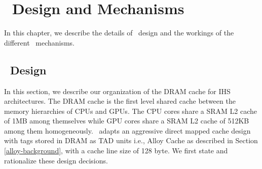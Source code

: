 \chapter{\cachename\ Design and Mechanisms} \label{chap:hashcache}
In this chapter, we describe the details of \cachename\ design and the workings of the different \cachename\ mechanisms.
\section{\cachename\ Design} \label{design}
In this section, we describe our organization of the DRAM cache for IHS architectures. The DRAM cache is the first level shared cache between the memory hierarchies of CPUs and GPUs. The CPU cores share a SRAM L2 cache of 1MB among themselves while GPU cores share a SRAM L2 cache of 512KB among them homogeneously. \cachename\ adapts an aggressive direct mapped cache design with tags stored in DRAM as TAD units i.e., Alloy Cache as described in Section \ref{alloy-background}, with a cache line size of 128 byte. We first state and rationalize these design decisions.

